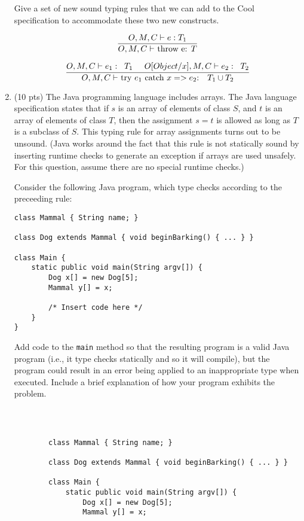 \documentclass[10pt]{article}
\newcommand{\infertext}[2]{\infer{{\textrm{#1}}}{#2}}
\begin{document}
\begin{enumerate}
Give a set of new sound typing rules that we can add to the Cool specification
to accommodate these two new constructs.

\medskip

\[
\infertext
  {$O,M,C \vdash$ throw e: $T$}
  {O,M,C \vdash e: T_1}
\]

\[
\infertext
    {$O,M,C \vdash$ try $e_1$ catch $x => e_2$: $\;\;T_1 \cup T_2$}
    {\textrm{$O,M,C \vdash e_1:\;\;T_1 \;\;\;\;\; O[Object/x],M,C \vdash e_2:\;\;T_2$}}
\]


\item (10 pts) The Java programming language includes arrays.  The Java
language specification states that if $s$ is an array of elements of
class $S$, and $t$ is an array of elements of class $T$, then the
assignment $s = t$ is allowed as long as $T$ is a subclass of $S$.
This typing rule for array assignments turns out to be unsound. (Java
works around the fact that this rule is not statically sound by inserting
runtime checks to generate an exception if arrays are used
unsafely. For this question, assume there are no special runtime checks.)

Consider the following Java program, which type checks according
to the preceeding rule:
\begin{verbatim}
class Mammal { String name; }

class Dog extends Mammal { void beginBarking() { ... } }

class Main {
    static public void main(String argv[]) {
        Dog x[] = new Dog[5];
        Mammal y[] = x;

        /* Insert code here */
    }
}
\end{verbatim}
Add code to the \texttt{main} method so that the resulting program is
a valid Java program (i.e., it type checks statically and so it will
compile), but the program could result in an error being applied
to an inappropriate type when executed.  Include a brief explanation
of how your program exhibits the problem.


\begin{verbatim}



        class Mammal { String name; }

        class Dog extends Mammal { void beginBarking() { ... } }
        
        class Main {
            static public void main(String argv[]) {
                Dog x[] = new Dog[5];
                Mammal y[] = x;
        

\end{verbatim}
\end{enumerate}
\end{document}
